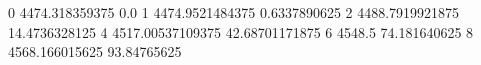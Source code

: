 0 4474.318359375 0.0
1 4474.9521484375 0.6337890625
2 4488.7919921875 14.4736328125
4 4517.00537109375 42.68701171875
6 4548.5 74.181640625
8 4568.166015625 93.84765625
